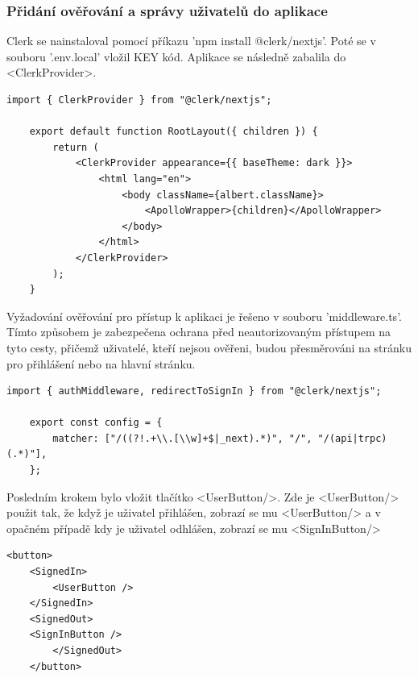 \documentclass[12pt, a4paper,
oneside,      %
openright
]{report}
\begin{document}
\subsubsection{Přidání ověřování a správy uživatelů do aplikace}
Clerk se nainstaloval pomocí příkazu 'npm install @clerk/nextjs'. Poté se v souboru '.env.local' vložil KEY kód. Aplikace se následně zabalila do <ClerkProvider>. 

\vspace{10pt}

\begin{lstlisting}[style=JavaScript, title={Kód}, caption={Ukázka <ClerkProvider> v layout.js}] 
	import { ClerkProvider } from "@clerk/nextjs";
	
	export default function RootLayout({ children }) {
		return (
			<ClerkProvider appearance={{ baseTheme: dark }}>
				<html lang="en">
					<body className={albert.className}>
						<ApolloWrapper>{children}</ApolloWrapper>
					</body>
				</html>
			</ClerkProvider>
		);
	}
\end{lstlisting}

\vspace{10pt}

Vyžadování ověřování pro přístup k aplikaci je řešeno v souboru 'middleware.ts'. Tímto způsobem je zabezpečena ochrana před neautorizovaným přístupem na tyto cesty, přičemž uživatelé, kteří nejsou ověřeni, budou přesměrováni na stránku pro přihlášení nebo na hlavní stránku.

\vspace{10pt}

\begin{lstlisting}[style=JavaScript, title={Kód}, caption={Ukázka kódu v middleware.ts}] 
	import { authMiddleware, redirectToSignIn } from "@clerk/nextjs";
	
	export const config = {
		matcher: ["/((?!.+\\.[\\w]+$|_next).*)", "/", "/(api|trpc)(.*)"],
	};
\end{lstlisting}

\newpage
Posledním krokem bylo vložit tlačítko <UserButton/>. Zde je <UserButton/> použit tak, že když je uživatel přihlášen, zobrazí se mu <UserButton/> a v opačném případě kdy je uživatel odhlášen, zobrazí se mu <SignInButton/>

\vspace{10pt}

\begin{lstlisting}[style=JavaScript, title={Kód}, caption={Ukázka kódu v middleware.ts}] 
	<button>
	<SignedIn>
		<UserButton />
	</SignedIn>
	<SignedOut>
	<SignInButton />
		</SignedOut>
	</button>
\end{lstlisting}
\end{document}
